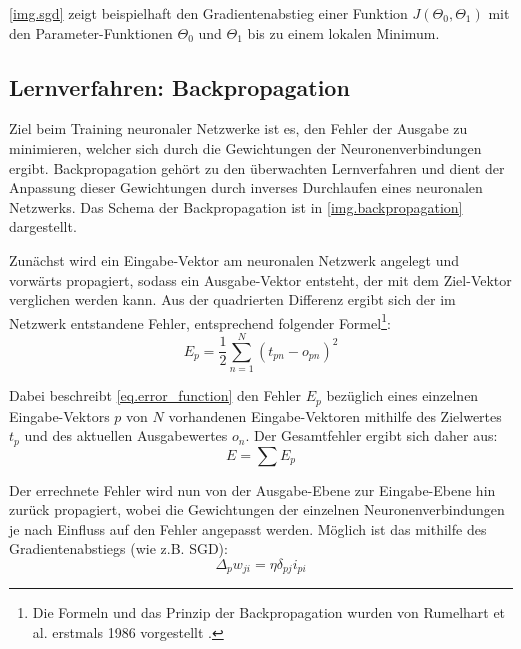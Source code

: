 \autoref{img.sgd} zeigt beispielhaft den Gradientenabstieg einer Funktion $J(\Theta_0, \Theta_1)$ mit den Parameter-Funktionen $\Theta_0$ und $\Theta_1$ bis zu einem lokalen Minimum.


\subsection{Lernverfahren: Backpropagation}\label{ss.backpropagation}
Ziel beim Training neuronaler Netzwerke ist es, den Fehler der Ausgabe zu minimieren, welcher sich durch die Gewichtungen der Neuronenverbindungen ergibt. Backpropagation gehört zu den überwachten Lernverfahren und dient der Anpassung dieser Gewichtungen durch inverses Durchlaufen eines neuronalen Netzwerks. Das Schema der Backpropagation ist in \autoref{img.backpropagation} dargestellt.


Zunächst wird ein Eingabe-Vektor am neuronalen Netzwerk angelegt und vorwärts propagiert, sodass ein Ausgabe-Vektor entsteht, der mit dem Ziel-Vektor verglichen werden kann. Aus der quadrierten Differenz ergibt sich der im Netzwerk entstandene Fehler, entsprechend folgender Formel\footnote{Die Formeln und das Prinzip der Backpropagation wurden von Rumelhart et al. erstmals 1986 vorgestellt \citep{Rumelhart1986}.}:
\begin{equation}
    E_p = \frac{1}{2}\sum_{n=1}^N \left(t_{pn} - o_{pn}\right)^2  \label{eq.error_function}
\end{equation}

Dabei beschreibt \autoref{eq.error_function} den Fehler $E_p$ bezüglich eines einzelnen Eingabe-Vektors $p$ von $N$ vorhandenen Eingabe-Vektoren mithilfe des Zielwertes $t_p$ und des aktuellen Ausgabewertes $o_n$. Der Gesamtfehler ergibt sich daher aus:
\begin{equation}
    E = \sum E_p  \label{eq.total_error_function}
\end{equation}

Der errechnete Fehler wird nun von der Ausgabe-Ebene zur Eingabe-Ebene hin zurück propagiert, wobei die Gewichtungen der einzelnen Neuronenverbindungen je nach Einfluss auf den Fehler angepasst werden. Möglich ist das mithilfe des Gradientenabstiegs (wie z.B. SGD):
\begin{equation}
    \Delta_pw_{ji} = \eta\delta_{pj}i_{pi}  \label{eq.delta_error_function}
\end{equation}

